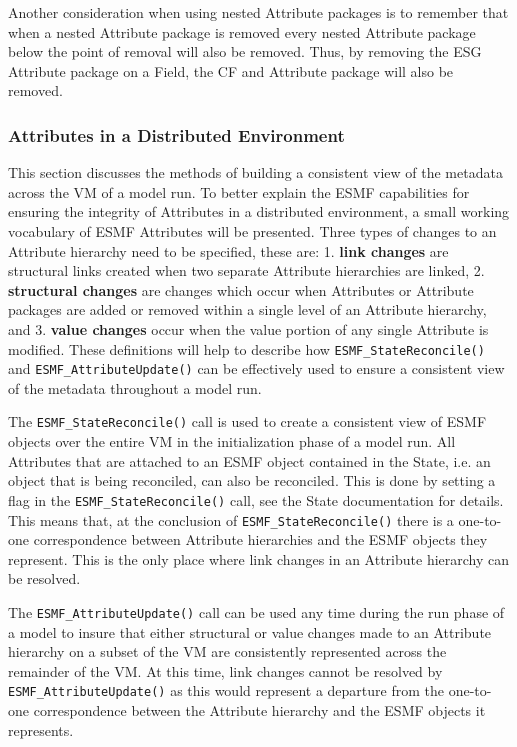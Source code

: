Another consideration when using nested Attribute packages is to remember that when a nested Attribute package is removed every nested Attribute package below the point of removal will also be removed.  Thus, by removing the ESG Attribute package on a Field, the CF and Attribute package will also be removed.

\subsubsection{Attributes in a Distributed Environment}
\label{sec:Att:Dist}

This section discusses the methods of building a consistent view of the metadata across the VM of a model run.  To better explain the ESMF capabilities for ensuring the integrity of Attributes in a distributed environment, a small working vocabulary of ESMF Attributes will be presented.  Three types of changes to an Attribute hierarchy need to be specified, these are: 1. {\bf link changes} are structural links created when two separate Attribute hierarchies are linked, 2. {\bf structural changes} are changes which occur when Attributes or Attribute packages are added or removed within a single level of an Attribute hierarchy, and 3. {\bf value changes} occur when the value portion of any single Attribute is modified.  These definitions will help to describe how {\tt ESMF\_StateReconcile()} and {\tt ESMF\_AttributeUpdate()} can be effectively used to ensure a consistent view of the metadata throughout a model run.

The {\tt ESMF\_StateReconcile()} call is used to create a consistent view of ESMF objects over the entire VM in the initialization phase of a model run.  All Attributes that are attached to an ESMF object contained in the State, i.e. an object that is being reconciled, can also be reconciled.  This is done by setting a flag in the {\tt ESMF\_StateReconcile()} call, see the State documentation for details.  This means that, at the conclusion of {\tt ESMF\_StateReconcile()} there is a one-to-one correspondence between Attribute hierarchies and the ESMF objects they represent.  This is the only place where link changes in an Attribute hierarchy can be resolved.

The {\tt ESMF\_AttributeUpdate()} call can be used any time during the run phase of a model to insure that either structural or value changes made to an Attribute hierarchy on a subset of the VM are consistently represented across the remainder of the VM.  At this time, link changes cannot be resolved by {\tt ESMF\_AttributeUpdate()} as this would represent a departure from the one-to-one correspondence between the Attribute hierarchy and the ESMF objects it represents.  


